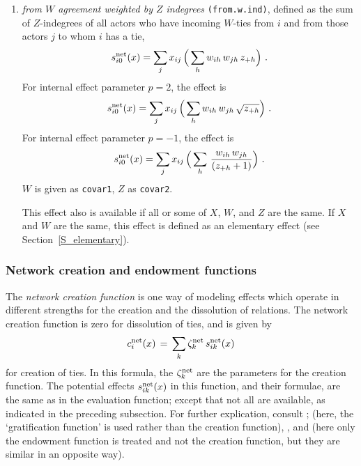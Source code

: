 \documentclass[a4paper,fleqn,11pt]{article}
\newcommand{\+}{\, + \,}
\newcommand{\vit}{\theenumi}
\newcounter{savenumi}
\begin{document}
\begin{enumerate}
\setcounter{enumi}{\value{savenumi}}
\item \emph{from $W$ agreement weighted by $Z$ indegrees} \texttt{(from.w.ind)},
      defined as the sum of $Z$-indegrees of all
      actors who have incoming $W$-ties from $i$ and from those actors
      $j$ to whom $i$ has a tie,
\[
 s^{\rm net}_{i\vit}(x) = \sum_j x_{ij}\,
        \Big( \sum_{h} w_{ih}\,w_{jh} \, z_{+h} \Big) \ .
\]
     For internal effect parameter $p=2$, the effect is
\[
 s^{\rm net}_{i\vit}(x) = \sum_j x_{ij}\,
        \Big( \sum_{h} w_{ih}\,w_{jh} \, \sqrt{ z_{+h}} \Big) \ .
\]
     For internal effect parameter $p=-1$, the effect is
\[
 s^{\rm net}_{i\vit}(x) = \sum_j x_{ij}\,
        \Big( \sum_{h} \, \frac{ w_{ih}\,w_{jh} }{( z_{+h}+1) } \Big) \ .
\]
    $W$ is given as \texttt{covar1}, $Z$ as \texttt{covar2}.

    This effect also is available if all or some of $X$, $W$, and $Z$ are the same.
    If $X$ and $W$ are the same, this effect is defined as an elementary effect
    (see Section~\ref{S_elementary}).
\setcounter{savenumi}{\value{enumi}}
\end{enumerate}

\subsubsection{Network creation and endowment functions}
\label{S_c}
\label{S_e}

The \emph{network creation function}
is one way of modeling effects which operate in
different strengths for the creation and the dissolution of
relations.
The network creation function is zero for dissolution of ties,
and is given by
\begin{equation}
c^{\rm net}_i(x) \, = \, \sum_k \zeta_k^{\rm net} \, s^{\rm net}_{ik}(x)
                             \label{c_net}
\end{equation}
for creation of ties.
In this formula, the $\zeta_k^{\rm net}$
are the parameters for the creation function.
The potential effects $s^{\rm net}_{ik}(x) $ in this function, and their
formulae, are the same as in the evaluation function;
except that not all are available, as indicated in the preceding subsection.
For further explication, consult \citet{Snijders01, Snijders05};
(here, the `gratification function' is used rather than the creation function),
\citet*{SnijdersEA07}, and \citet*{SteglichEA10}
(here only the endowment function is treated and not the creation function,
but they are similar in an opposite way).
\end{document}
